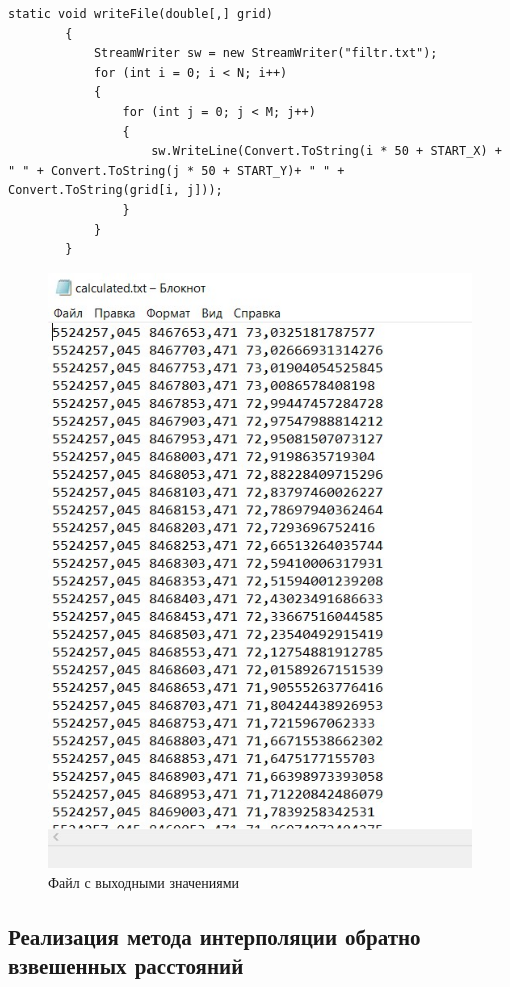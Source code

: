 \begin{lstlisting}[caption={Метод WriteFile}, label={ls:03}]
        static void writeFile(double[,] grid)
        {
            StreamWriter sw = new StreamWriter("filtr.txt");
            for (int i = 0; i < N; i++)
            {
                for (int j = 0; j < M; j++)
                {
                    sw.WriteLine(Convert.ToString(i * 50 + START_X) + " " + Convert.ToString(j * 50 + START_Y)+ " " + Convert.ToString(grid[i, j]));
                }
            }
        }
\end{lstlisting}

\begin{figure}[h!]
    \center
    \includegraphics[scale=0.8]{images/555.jpg}
    \caption{Файл с выходными значениями}
    \label{fig:11}
\end{figure}

\subsection{Реализация метода интерполяции обратно взвешенных расстояний}

